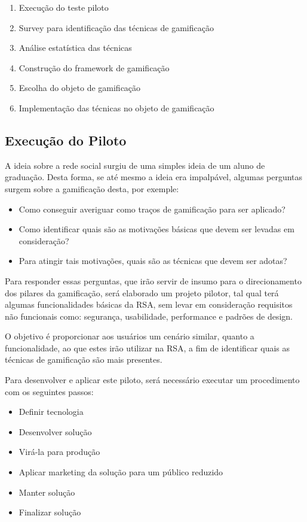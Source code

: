 \begin{enumerate}
    \item Execução do teste piloto
    \item Survey para identificação das técnicas de gamificação
    \item Análise estatística das técnicas
    \item Construção do framework de gamificação
    \item Escolha do objeto de gamificação
    \item Implementação das técnicas no objeto de gamificação
\end{enumerate}

\subsection{Execução do Piloto}
\label{sub:execu_o_do_piloto}
A ideia sobre a rede social surgiu de uma simples ideia de um aluno de graduação. Desta forma, se até mesmo a
ideia era impalpável, algumas perguntas surgem sobre a gamificação desta, por exemple:

\begin{itemize}
    \item Como conseguir averiguar como traços de gamificação para ser aplicado?
    \item Como identificar quais são as motivações básicas que devem ser levadas em consideração?
    \item Para atingir tais motivações, quais são as técnicas que devem ser adotas?
\end{itemize}

Para responder essas perguntas, que irão servir de insumo para o direcionamento dos pilares da gamificação, será elaborado um projeto pilotor, tal qual terá algumas funcionalidades básicas da RSA, sem levar em consideração requisitos não funcionais como: segurança, usabilidade, performance e padrões de design.

O objetivo é proporcionar aos usuários um cenário similar, quanto a funcionalidade, ao que estes irão utilizar
na RSA, a fim de identificar quais as técnicas de gamificação são mais presentes.

Para desenvolver e aplicar este piloto, será necessário executar um procedimento com os seguintes passos:

\begin{itemize}
    \item Definir tecnologia
    \item Desenvolver solução
    \item Virá-la para produção
    \item Aplicar marketing da solução para um público reduzido
    \item Manter solução
    \item Finalizar solução
\end{itemize}

